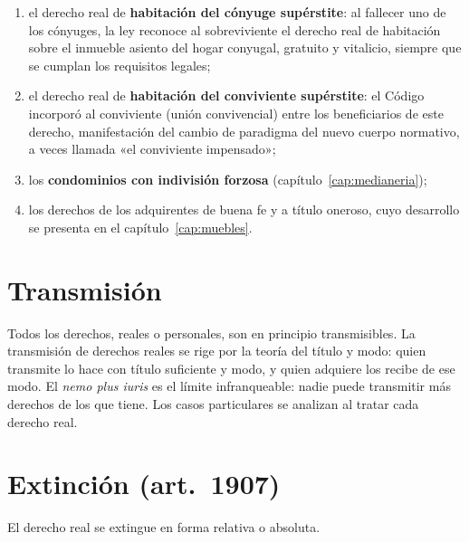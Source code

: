\documentclass[12pt,oneside]{book}
\begin{document}
\begin{enumerate}
    \item el derecho real de \textbf{habitación del cónyuge supérstite}: al fallecer uno de los cónyuges, la ley reconoce al sobreviviente el derecho real de habitación sobre el inmueble asiento del hogar conyugal, gratuito y vitalicio, siempre que se cumplan los requisitos legales;
    \item el derecho real de \textbf{habitación del conviviente supérstite}: el Código incorporó al conviviente (unión convivencial) entre los beneficiarios de este derecho, manifestación del cambio de paradigma del nuevo cuerpo normativo, a veces llamada «el conviviente impensado»;
    \item los \textbf{condominios con indivisión forzosa} (capítulo~\ref{cap:medianeria});
    \item los derechos de los adquirentes de buena fe y a título oneroso, cuyo desarrollo se presenta en el capítulo~\ref{cap:muebles}.
\end{enumerate}

\section{Transmisión}

Todos los derechos, reales o personales, son en principio transmisibles. La transmisión de derechos reales se rige por la teoría del título y modo: quien transmite lo hace con título suficiente y modo, y quien adquiere los recibe de ese modo. El \textit{nemo plus iuris} es el límite infranqueable: nadie puede transmitir más derechos de los que tiene. Los casos particulares se analizan al tratar cada derecho real.

\section{Extinción (art.~1907)}

El derecho real se extingue en forma relativa o absoluta.
\end{document}
